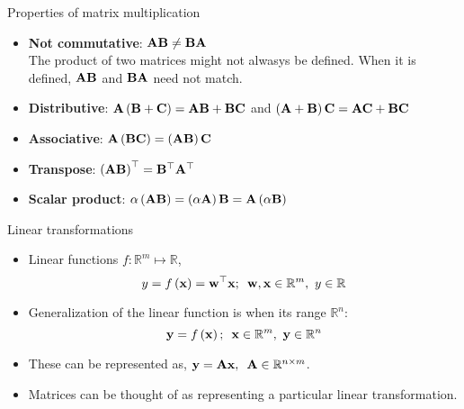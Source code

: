 \documentclass[aspectratio=169]{beamer}
\begin{document}
\begin{frame}[t]{Properties of matrix multiplication}
  \begin{itemize}
    \item \textbf{Not commutative}: $\mathbf{A}\mathbf{B} \neq \mathbf{B}\mathbf{A}$\\
    The product of two matrices might not alwasys be defined. When it is defined, $\mathbf{A}\mathbf{B}$ and $\mathbf{B}\mathbf{A}$ need not match.
    \item \textbf{Distributive}:  $\mathbf{A}\left(\mathbf{B} + \mathbf{C}\right) = \mathbf{A}\mathbf{B} + \mathbf{B}\mathbf{C}$ and $\left(\mathbf{A} + \mathbf{B}\right)\mathbf{C} = \mathbf{A}\mathbf{C} + \mathbf{B}\mathbf{C}$ 
    \item \textbf{Associative}: $\mathbf{A}\left(\mathbf{B}\mathbf{C}\right) = \left(\mathbf{A}\mathbf{B}\right)\mathbf{C} $
    \item \textbf{Transpose}: $\left(\mathbf{A}\mathbf{B}\right)^{\top} = \mathbf{B}^{\top}\mathbf{A}^{\top}$
    \item \textbf{Scalar product}: $\alpha\left(\mathbf{A}\mathbf{B}\right) = \left(\alpha \mathbf{A}\right)\mathbf{B} = \mathbf{A}\left(\alpha \mathbf{B}\right)$
  \end{itemize}
\end{frame}


\begin{frame}[t]{Linear transformations}
  \begin{itemize}
    \item Linear functions $f: \mathbb{R}^m \mapsto \mathbb{R}$, 
    \[ y = f\left(\mathbf{x}\right) = \mathbf{w}^{\top}\mathbf{x}; \,\,\, \mathbf{w}, \mathbf{x} \in \mathbb{R}^m, \,\, y \in \mathbb{R} \]
    
    \item Generalization of the linear function is when its range $\mathbb{R}^n$:
    \[ \mathbf{y} = f\left(\mathbf{x}\right); \,\,\, \mathbf{x} \in \mathbb{R}^m, \,\, \mathbf{y} \in \mathbb{R}^n \]
    
    \item These can be represented as, $\mathbf{y} = \mathbf{Ax}, \,\,\, \mathbf{A} \in \mathbb{R}^{n \times m}$.\\
    
    \item Matrices can be thought of as representing a particular linear transformation.
  \end{itemize}
\end{frame}
\end{document}
